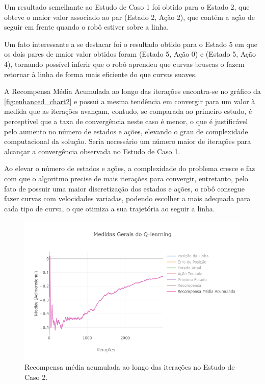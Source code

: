 \documentclass[a4paper]{ifacconf}
\begin{document}
Um resultado semelhante ao Estudo de Caso 1 foi obtido para o Estado 2, que obteve o maior valor associado ao par (Estado 2, Ação 2), que contém a ação de seguir em frente quando o robô estiver sobre a linha. 

Um fato interessante a se destacar foi o resultado obtido para o Estado 5 em que os dois pares de maior valor obtidos foram (Estado 5, Ação 0) e (Estado 5, Ação 4), tornando possível inferir que o robô aprendeu que curvas bruscas o fazem retornar à linha de forma mais eficiente do que curvas suaves. 

A Recompensa Média Acumulada ao longo das iterações encontra-se no gráfico da \autoref{fig:enhanced_chart2} e possui a mesma tendência em convergir para um valor à medida que as iterações avançam, contudo, se comparada ao primeiro estudo, é perceptível que a taxa de convergência neste caso é menor, o que é justificável pelo aumento no número de estados e ações, elevando o grau de complexidade computacional da solução. Seria necessário um número maior de iterações para alcançar a convergência observada no Estudo de Caso 1.

Ao elevar o número de estados e ações, a complexidade do problema cresce e faz com que o algoritmo precise de mais iterações para convergir, entretanto, pelo fato de possuir uma maior discretização dos estados e ações, o robô consegue fazer curvas com velocidades variadas, podendo escolher a mais adequada para cada tipo de curva, o que otimiza a sua trajetória ao seguir a linha.

\begin{figure}
\centering 
\caption{Recompensa média acumulada ao longo das iterações no Estudo de Caso 2.} \label{fig:enhanced_chart2}
\includegraphics[scale=0.38]{Figuras/enhanced_chart2.png}
\end{figure}
\end{document}
